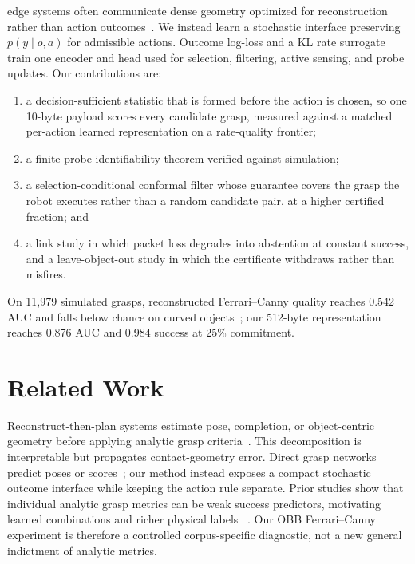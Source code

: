 \documentclass[letterpaper, 10pt, conference]{ieeeconf}
\makeatletter
\let\PARstart\@IEEESAVECMDPARstart
\makeatother
\begin{document}
\PARstart{R}{obotic} edge systems often communicate dense geometry optimized
for reconstruction rather than action outcomes~\cite{shi2016edge,%
wen2024foundationpose,fang2020graspnet}. We instead
learn a stochastic interface preserving $p(y\mid o,a)$ for admissible actions.
Outcome log-loss and a KL rate surrogate train one encoder and head used for
selection, filtering, active sensing, and probe updates. Our contributions are:
\begin{enumerate}
\item a decision-sufficient statistic that is formed before the action is chosen, so
one 10-byte payload scores every candidate grasp, measured against a matched
per-action learned representation on a rate-quality frontier;
\item a finite-probe identifiability theorem verified against simulation;
\item a selection-conditional conformal filter whose guarantee covers the grasp the
robot executes rather than a random candidate pair, at a higher certified fraction; and
\item a link study in which packet loss degrades into abstention at constant success,
and a leave-object-out study in which the certificate withdraws rather than misfires.
\end{enumerate}
On 11{,}979 simulated grasps, reconstructed Ferrari--Canny quality reaches
0.542 AUC and falls below chance on curved objects~\cite{ferrari1992planning,%
roa2015grasp}; our 512-byte representation reaches 0.876 AUC and 0.984 success
at 25\% commitment.

\section{Related Work}
\label{sec:related}

Reconstruct-then-plan systems estimate pose, completion, or object-centric
geometry before applying analytic grasp criteria~\cite{wen2024foundationpose,%
ferrari1992planning}. This decomposition is
interpretable but propagates contact-geometry error. Direct grasp networks
predict poses or scores~\cite{mahler2017dexnet,fang2020graspnet}; our method instead exposes a compact
stochastic outcome interface while keeping the action rule separate.
Prior studies show that individual analytic grasp metrics can be weak success
predictors, motivating learned combinations and richer physical labels
~\cite{rubert2017relevance,roa2015grasp,lu2022hybrid}. Our OBB
Ferrari--Canny experiment is therefore a controlled corpus-specific diagnostic,
not a new general indictment of analytic metrics.
\end{document}
